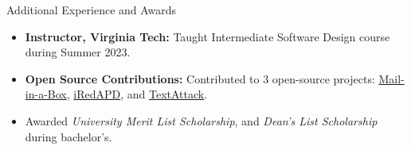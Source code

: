 \documentclass[]{mcdowellcv}
\begin{document}
	\begin{cvsection}{Additional Experience and Awards}
		\begin{cvsubsection}{}{}{}
			\begin{itemize}
				\item \textbf{Instructor, Virginia Tech:} Taught Intermediate Software Design course during Summer 2023.
    			\item \textbf{Open Source Contributions:} Contributed to 3 open-source projects: \href{https://github.com/mail-in-a-box/mailinabox}{Mail-in-a-Box}, \href{https://github.com/iredmail/iRedAPD}{iRedAPD}, and \href{https://github.com/QData/TextAttack}{TextAttack}.
				\item Awarded \emph{University Merit List Scholarship}, and \emph{Dean's List Scholarship} during bachelor's.
			\end{itemize}
		\end{cvsubsection}
	\end{cvsection}
\end{document}
